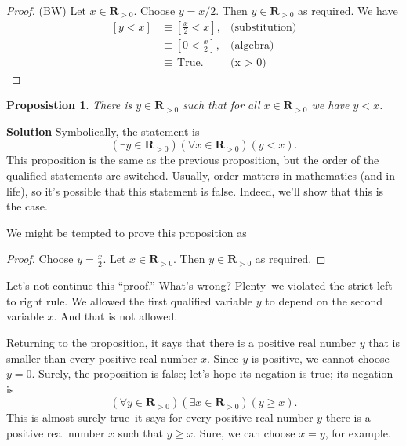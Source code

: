 \documentclass[12pt,fleqn,answers]{exam}
\newcommand{\reals}{\mathbf{R}}
\newcommand{\true}{\, \mathrm{True}}
\newenvironment{myproof}
  {\begin{shaded}\begin{proof}}
  {\end{proof}\end{shaded}}
\newtheorem{prop}{Proposistion}
\begin{document}
      \begin{myproof} (BW) Let $x \in \reals_{>0}$. Choose $y = x/2$. Then $y \in \reals_{>0}$ as required. We have
         \begin{align*}
         \left[y < x \right] &\equiv \left[\frac{x}{2} < x \right], &\mbox{(substitution)} \\
                                   &\equiv \left[0 < \frac{x}{2}  \right], &\mbox{(algebra)} \\
                                   &\equiv \true.  &\mbox{(x > 0)}
      \end{align*}
      \end{myproof}

      
      \begin{prop} There is $y \in \reals_{> 0}$ such that for all 
        $x \in \reals_{>0}$ we have $y < x$.
      \end{prop}
       
      \noindent \textbf{Solution}  Symbolically, the statement is
       \begin{equation*}
         \left(\exists y \in \reals_{>0}\right)\left(\forall x \in \reals_{>0}\right) \left(y < x \right).
       \end{equation*}
       This proposition is the same as the previous proposition, but
       the order of the qualified statements are switched. Usually,
       order matters in mathematics (and in life), so it's possible 
       that this statement is false. Indeed, we'll show that this 
       is the case. 
       
       We might be tempted to prove this proposition as

       \begin{myproof} Choose $y=\frac{x}{2}$. Let $x \in \reals_{>0}$.
        Then $y \in \reals_{>0}$ as required.
             \end{myproof}
       \noindent Let's not continue this ``proof.''  What's wrong?  Plenty--we 
       violated the strict left to right rule. We allowed the 
       first qualified variable $y$ to depend on the second variable 
       $x$. And that is not allowed.

      Returning to the proposition, it says that there is a 
      positive real number $y$ that is smaller 
       than every positive  real number $x$. Since $y$ is positive, we 
        cannot choose $y = 0$. Surely, the proposition is false;
       let's hope its negation is true; its negation is
       \begin{equation*}
         \left(\forall y \in \reals_{>0}\right)\left(\exists x \in \reals_{>0}\right) \left(y \geq  x \right).
       \end{equation*}
       This is almost surely true--it says for every positive real number $y$ there is a 
       positive real number $x$ such that
       $y \geq x$.    Sure, we can choose $x = y$, for example.
\end{document}

